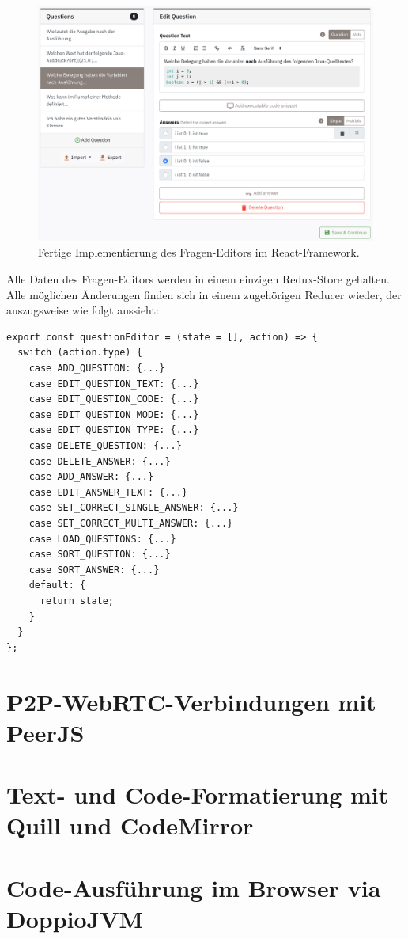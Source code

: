 \begin{figure}[H]
    \includegraphics[width=16cm]{chapter/entwurf/weclare_editor.png}
    \centering
    \caption{Fertige Implementierung des Fragen-Editors im React-Framework.}
    \label{Abbildung 4.2}
\end{figure}

Alle Daten des Fragen-Editors werden in einem einzigen Redux-Store gehalten. Alle möglichen Änderungen finden sich in einem zugehörigen Reducer wieder, der auszugsweise wie folgt aussieht:


\begin{minipage}{\linewidth}
\begin{lstlisting}[caption={Auszug aus dem Reducer für den Fragen-Editor.}]
export const questionEditor = (state = [], action) => {
  switch (action.type) {
    case ADD_QUESTION: {...}
    case EDIT_QUESTION_TEXT: {...}
    case EDIT_QUESTION_CODE: {...}
    case EDIT_QUESTION_MODE: {...}
    case EDIT_QUESTION_TYPE: {...}
    case DELETE_QUESTION: {...}
    case DELETE_ANSWER: {...}
    case ADD_ANSWER: {...}
    case EDIT_ANSWER_TEXT: {...}
    case SET_CORRECT_SINGLE_ANSWER: {...}
    case SET_CORRECT_MULTI_ANSWER: {...}
    case LOAD_QUESTIONS: {...}
    case SORT_QUESTION: {...}
    case SORT_ANSWER: {...}
    default: {
      return state;
    }
  }
};
\end{lstlisting}
\end{minipage}


\newpage
\section{P2P-WebRTC-Verbindungen mit PeerJS}
\label{chap:p2p}



\newpage
\section{Text- und Code-Formatierung mit Quill und CodeMirror}
\label{chap:formatierung}


\newpage
\section{Code-Ausführung im Browser via DoppioJVM}
\label{chap:ausfuehrung}
